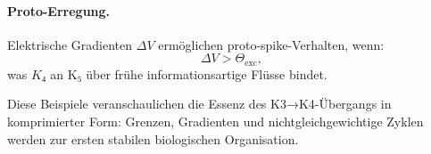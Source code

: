 \paragraph{Proto-Erregung.}
Elektrische Gradienten $\Delta V$ ermöglichen proto-spike-Verhalten, wenn:
\[
\Delta V > \Theta_{\mathrm{exc}},
\]
was $K₄$ an K₅ über frühe informationsartige Flüsse bindet.

Diese Beispiele veranschaulichen die Essenz des K3→K4-Übergangs in komprimierter
Form: Grenzen, Gradienten und nichtgleichgewichtige Zyklen werden zur ersten
stabilen biologischen Organisation.
